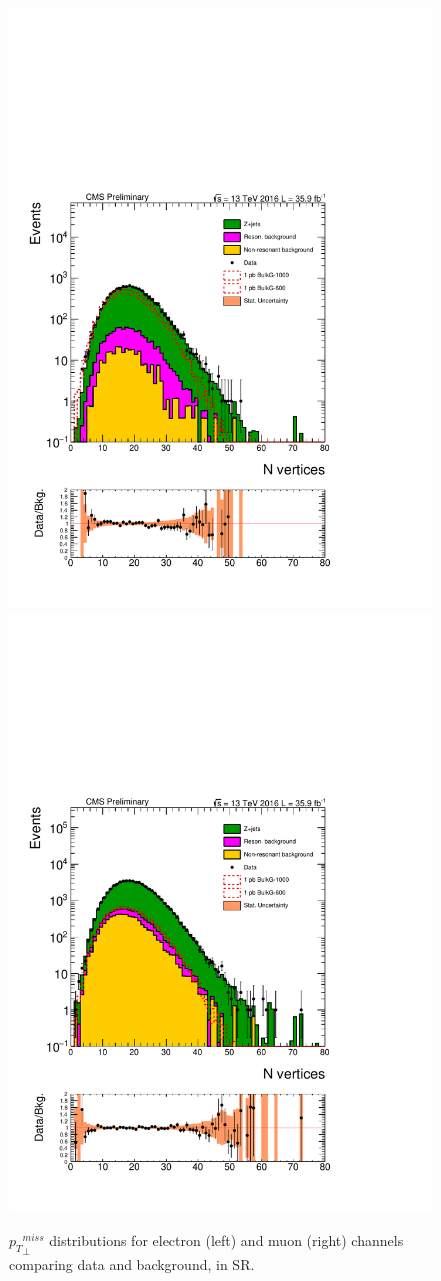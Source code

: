 \begin{figure}[htbp!]
\centering
\includegraphics[width=0.46\linewidth,page=23]{figures/ReMiniSummer16_DT_PhReMiniMCRcFixXsec_GMCPhPtWt_SRdPhiGT0p5_puWeightsummer16_muoneg_gjet_metfilter_unblind_el_log_1pb.pdf}
\includegraphics[width=0.46\linewidth,page=23]{figures/ReMiniSummer16_DT_PhReMiniMCRcFixXsec_GMCPhPtWt_SRdPhiGT0p5_puWeightsummer16_muoneg_gjet_metfilter_unblind_mu_log_1pb.pdf}
\caption{${p_{T}}^{miss}_\perp$ distributions for electron (left) and muon (right)
channels comparing data and background, in SR.}
\label{fit:SR_gjet_metperp}
\end{figure}

